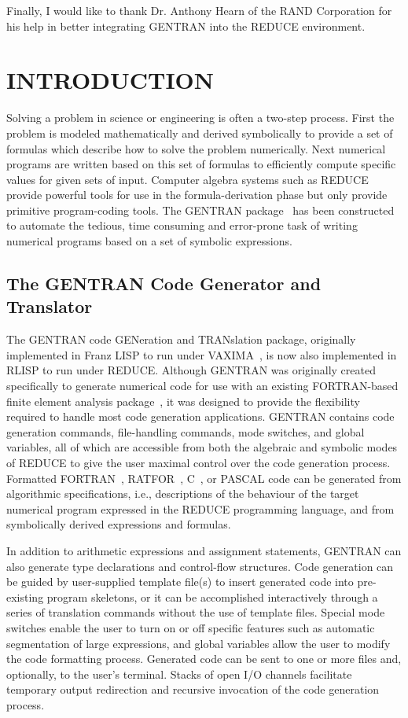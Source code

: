 Finally, I would like to thank Dr. Anthony Hearn of the RAND
Corporation for his help in better integrating GENTRAN into the REDUCE
environment.

\section{INTRODUCTION}

Solving a problem in science or engineering is often a two-step
process.  First the problem is modeled mathematically and derived
symbolically to provide a set of formulas which describe how to solve
the problem numerically.  Next numerical programs are written based on
this set of formulas to efficiently compute specific values for given
sets of input.  Computer algebra systems such as REDUCE
provide powerful tools for use in the formula-derivation phase but
only provide primitive program-coding tools.  The GENTRAN 
package~\cite{Gates:85,Gates:85a,Gates:85b,Gates:86}
has been constructed to automate the tedious,
time consuming and error-prone task of writing numerical programs
based on a set of symbolic expressions.

\subsection{The GENTRAN Code Generator and Translator}
The GENTRAN code GENeration and TRANslation package, originally
implemented in Franz LISP to run under VAXIMA~\cite{Gates:84}, is now also
implemented in RLISP to run under REDUCE.  Although GENTRAN
was originally created specifically to generate numerical
code for use with an existing FORTRAN-based finite element analysis
package~\cite{Wang:86,Wang:84}, it was designed
to provide the flexibility required to handle most code generation
applications.  GENTRAN contains code generation commands, file-handling
commands, mode switches, and global variables, all of which are
accessible from both the algebraic and symbolic modes of REDUCE to
give the user maximal control over the code generation process.  Formatted
  
FORTRAN~\cite{FORTRAN}, RATFOR~\cite{Kernighan:79}, C~\cite{Kernighan:78},
or PASCAL code can be generated from algorithmic specifications,
i.e., descriptions of the behaviour of the target numerical program expressed
in the REDUCE programming language, and from symbolically derived expressions
and formulas.

In addition to arithmetic expressions and assignment statements,
GENTRAN can also generate type declarations and control-flow
structures.  Code generation can be guided by user-supplied
template file(s) to insert generated code into pre-existing program
skeletons, or it can be accomplished interactively through a series
of translation commands without the use of template files.  Special
mode switches enable the user to turn on or off specific features such as
automatic segmentation of large expressions, and global variables
allow the user to modify the code formatting process.  Generated
code can be sent to one or more files and, optionally, to
the user's terminal.  Stacks of open I/O channels facilitate temporary
output redirection and recursive invocation of the code generation process.


